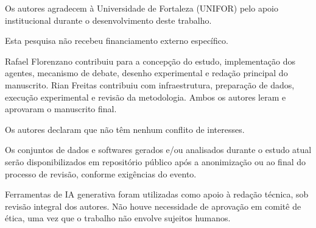 \documentclass[portuguese]{sbc2025}%
\begin{document}
\begin{declarations}

\begin{acknowledgements}
Os autores agradecem à Universidade de Fortaleza (UNIFOR) pelo apoio institucional durante o desenvolvimento deste trabalho.
\end{acknowledgements}

\begin{funding}
Esta pesquisa não recebeu financiamento externo específico.
\end{funding}

\begin{contributions}
Rafael Florenzano contribuiu para a concepção do estudo, implementação dos agentes, mecanismo de debate, desenho experimental e redação principal do manuscrito. Rian Freitas contribuiu com infraestrutura, preparação de dados, execução experimental e revisão da metodologia. Ambos os autores leram e aprovaram o manuscrito final.
\end{contributions}

\begin{interests}
Os autores declaram que não têm nenhum conflito de interesses.
\end{interests}

\begin{materials}
Os conjuntos de dados e softwares gerados e/ou analisados durante o estudo atual serão disponibilizados em repositório público após a anonimização ou ao final do processo de revisão, conforme exigências do evento.
\end{materials}

\begin{furtherinformation}
Ferramentas de IA generativa foram utilizadas como apoio à redação técnica, sob revisão integral dos autores. Não houve necessidade de aprovação em comitê de ética, uma vez que o trabalho não envolve sujeitos humanos.
\end{furtherinformation}
\end{declarations}





\end{document}

